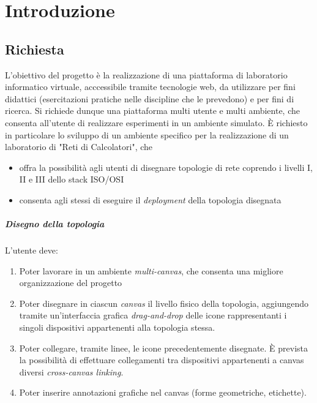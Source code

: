 \documentclass[../main.tex]{subfiles}
\begin{document}
\chapter{Introduzione}
\section{Richiesta}
L'obiettivo del progetto è la realizzazione di una piattaforma di laboratorio informatico virtuale, acccessibile tramite tecnologie web, da utilizzare per fini didattici (esercitazioni pratiche nelle discipline che le prevedono) e per fini di ricerca.
Si richiede dunque una piattaforma multi utente e multi ambiente, che consenta all'utente di realizzare esperimenti in un ambiente simulato.
È richiesto in particolare lo sviluppo di un ambiente specifico per la realizzazione di un laboratorio di "Reti di Calcolatori", che
\begin{itemize}
    \item offra la possibilità agli utenti di disegnare topologie di rete coprendo i livelli I, II e III dello stack ISO/OSI
    \item consenta agli stessi di eseguire il \textit{deployment} della topologia disegnata
\end{itemize}

\paragraph{Disegno della topologia}
L'utente deve:
\begin{enumerate}
    \item Poter lavorare in un ambiente \textit{multi-canvas}, che consenta una migliore organizzazione del progetto
    \item Poter disegnare in ciascun \textit{canvas} il livello fisico della topologia, aggiungendo tramite un'interfaccia grafica \textit{drag-and-drop} delle icone rappresentanti i singoli dispositivi appartenenti alla topologia stessa.
    \item Poter collegare, tramite linee, le icone precedentemente disegnate. È prevista la possibilità di effettuare collegamenti tra dispositivi appartenenti a canvas diversi \textit{cross-canvas linking}.
    \item Poter inserire annotazioni grafiche nel canvas (forme geometriche, etichette).
\end{enumerate}
\end{document}
